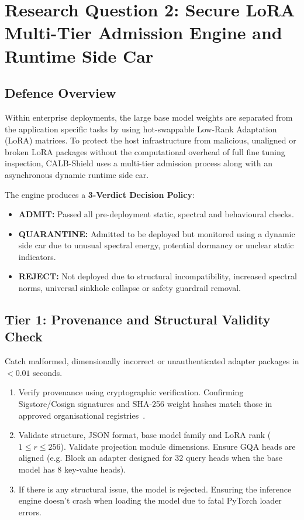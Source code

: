 \section{Research Question 2: Secure LoRA Multi-Tier Admission Engine and Runtime Side Car}
\label{sec:method_rq2}

\subsection{Defence Overview}
\label{subsec:rq2_overview}

Within enterprise deployments, the large base model weights are separated from the application specific tasks by using hot-swappable Low-Rank Adaptation (LoRA) matrices. To protect the host infrastructure from malicious, unaligned or broken LoRA packages without the computational overhead of full fine tuning inspection, CALB-Shield uses a multi-tier admission process along with an asynchronous dynamic runtime side car.

The engine produces a \textbf{3-Verdict Decision Policy}:
\begin{itemize}
    \item \textbf{ADMIT:} Passed all pre-deployment static, spectral and behavioural checks.
    \item \textbf{QUARANTINE:} Admitted to be deployed but monitored using a dynamic side car due to unusual spectral energy, potential dormancy or unclear static indicators.
    \item \textbf{REJECT:} Not deployed due to structural incompatibility, increased spectral norms, universal sinkhole collapse or safety guardrail removal.
\end{itemize}



\subsection{Tier 1: Provenance and Structural Validity Check}
\label{subsec:tier1}

Catch malformed, dimensionally incorrect or unauthenticated adapter packages in $< 0.01$ seconds.
\begin{enumerate}
    \item Verify provenance using cryptographic verification. Confirming Sigstore/Cosign signatures and SHA-256 weight hashes match those in approved organisational registries~\cite{openssf2022sigstore}.
    \item Validate structure, JSON format, base model family and LoRA rank ($1 \le r \le 256$). Validate projection module dimensions. Ensure GQA heads are aligned (e.g. Block an adapter designed for 32 query heads when the base model has 8 key-value heads).
    \item If there is any structural issue, the model is rejected. Ensuring the inference engine doesn't crash when loading the model due to fatal PyTorch loader errors.
\end{enumerate}

